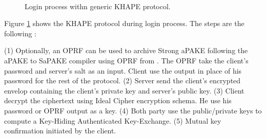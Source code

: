 \documentclass[../report.tex]{subfiles}
\begin{document}






\paragraph{}


\begin{figure}[h]
 \centering
 
 \setlength{\fboxsep}{10pt}
 \setlength{\fboxrule}{1pt}
 
 \caption{Login process withn generic KHAPE protocol.}
 \label{fig:Generic_KHAPE}
\end{figure}

Figure \ref{fig:Generic_KHAPE} shows the KHAPE protocol during login process.
The steps are the following :

(1) Optionally, an OPRF can be used to archive Strong aPAKE following the aPAKE to SaPAKE compiler using OPRF from \cite{OPAQUE_Paper}. The OPRF take the client's password and server's salt as an input. Client use the output in place of his password for the rest of the protocol.
(2) Server send the client's encrypted envelop containing the client's private key and server's public key.
(3) Client decrypt the ciphertext using Ideal Cipher encryption schema. He use his password or OPRF output as a key.
(4) Both party use the public/private keys to compute a Key-Hiding Authenticated Key-Exchange.
(5) Mutual key confirmation initiated by the client.
\end{document}
